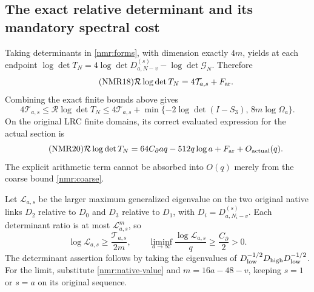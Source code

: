 \subsection{The exact relative determinant and its mandatory spectral cost}
Taking determinants in \eqref{nmr:forms}, with dimension exactly
$4m$, yields at each endpoint
$\log\det T_N=4\log\det D_{a,N-v}^{(s)}-\log\det\mathcal G_N$.
Therefore
\begin{equation}\tag{NMR18}\label{nmr:relative}
\mathcal R\log\det T_N=4\mathcal T_{a,s}+F_{\rm ar}.
\end{equation}
Combining the exact finite bounds above gives
\begin{equation}\tag{NMR19}\label{nmr:relative-interval}
4\mathcal T_{a,s}\leq\mathcal R\log\det T_N
\leq4\mathcal T_{a,s}
+\min\{-2\log\det(I-S_3),\,8m\log\Omega_a\}.
\end{equation}
On the original LRC finite domains, its correct evaluated expression
for the actual section is
\begin{equation}\tag{NMR20}\label{nmr:relative-asymptotic}
\mathcal R\log\det T_N
=64C_\partial aq-512q\log a+F_{\rm ar}+O_{\rm actual}(q).
\end{equation}
The explicit arithmetic term cannot be absorbed into $O(q)$ merely
from the coarse bound \eqref{nmr:coarse}.

Let $\mathscr L_{a,s}$ be the larger maximum generalized eigenvalue
on the two original native links $D_2$ relative to $D_0$ and $D_3$
relative to $D_1$, with $D_i=D_{a,N_i-v}^{(s)}$.
Each determinant ratio is at most $\mathscr L_{a,s}^{m}$,
so
\begin{equation}\tag{NMR21}\label{nmr:link-cost}
\log\mathscr L_{a,s}\geq\frac{\mathcal T_{a,s}}{2m},\qquad
\liminf_{a\to\infty}\frac{\log\mathscr L_{a,s}}q
\geq\frac{C_\partial}{2}>0 .
\end{equation}
The determinant assertion follows by taking the eigenvalues of
$D_{\rm low}^{-1/2}D_{\rm high}D_{\rm low}^{-1/2}$.
For the limit, substitute \eqref{nmr:native-value} and
$m=16a-48-v$, keeping $s=1$ or $s=a$ on its original sequence.

